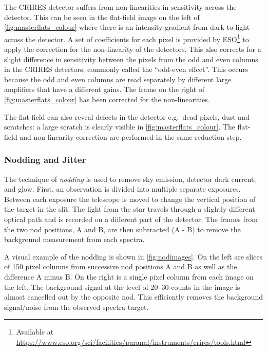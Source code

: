 The {CRIRES} detector suffers from non-linearities in sensitivity across the detector.
This can be seen in the flat-field image on the left of \cref{fig:masterflats_colour} where there is an intensity gradient from dark to light across the detector.
A set of coefficients for each pixel is provided by {ESO}\footnote{Available at \href{https://www.eso.org/sci/facilities/paranal/instruments/crires/tools.html}{https://www.eso.org/sci/facilities/paranal/instruments/crires/tools.html}} to apply the correction for the non-linearity of the detectors.
This also corrects for a slight difference in sensitivity between the pixels from the odd and even columns in the {CRIRES} detectors, commonly called the ``odd-even effect''.
This occurs because the odd and even columns are read separately by different large amplifiers that have a different gains.
The frame on the right of \cref{fig:masterflats_colour} has been corrected for the non-linearities.

The flat-field can also reveal defects in the detector e.g.\ dead pixels, dust and scratches: a large scratch is clearly visible in \cref{fig:masterflats_colour}.
The flat-field and non-linearity correction are performed in the same reduction step.


\subsubsection{Nodding and Jitter}
\label{subsec:nod-jitter}
The technique of \emph{nodding} is used to remove sky emission, detector dark current, and glow.
First, an observation is divided into multiple separate exposures.
Between each exposure the telescope is moved to change the vertical position of the target in the slit.
The light from the star travels through a slightly different optical path and is recorded on a different part of the detector.
The frames from the two nod positions, A and B, are then subtracted (A - B) to remove the background measurement from each spectra.

A visual example of the nodding is shown in \cref{fig:nodimages}.
On the left are slices of 150 pixel columns from successive nod positions A and B as well as the difference A minus B.
On the right is a single pixel column from each image on the left.
The background signal at the level of 20--30 counts in the image is almost cancelled out by the opposite nod.
This efficiently removes the background signal/noise from the observed spectra target.

